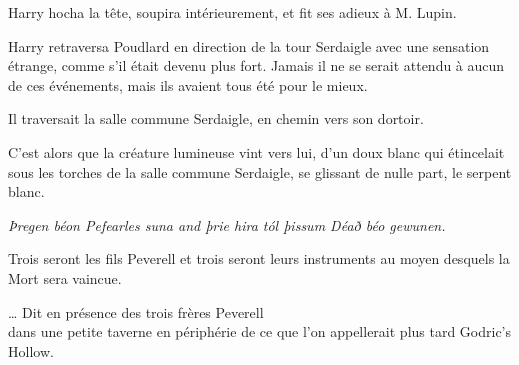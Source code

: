 Harry hocha la tête, soupira intérieurement, et fit ses adieux à M. Lupin.

\later

Harry retraversa Poudlard en direction de la tour Serdaigle avec une sensation étrange, comme s'il était devenu plus fort. Jamais il ne se serait attendu à aucun de ces événements, mais ils avaient tous été pour le mieux.

Il traversait la salle commune Serdaigle, en chemin vers son dortoir.

C'est alors que la créature lumineuse vint vers lui, d'un doux blanc qui étincelait sous les torches de la salle commune Serdaigle, se glissant de nulle part, le serpent blanc.

\later
\begin{center}
\emph{Þregen béon Pefearles suna and þrie hira tól þissum Déað béo gewunen.}

Trois seront les fils Peverell et trois seront leurs instruments au moyen desquels la Mort sera vaincue.

… Dit en présence des trois frères Peverell\\
dans une petite taverne en périphérie de ce que l'on appellerait plus tard Godric's Hollow. \end{center}

